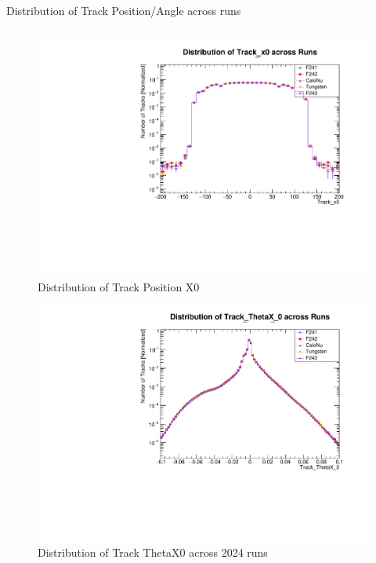 \begin{frame}{Distribution of Track Position/Angle across runs}
	\begin{columns}
		\begin{column}{0.5\linewidth}
			\vspace{-0.4cm}
			\begin{figure}
				\includegraphics[width=\linewidth]{./RunwisePlots/Track_x0_runwise.pdf}
				\caption{Distribution of Track Position X0}
			\end{figure}
			\vspace{-0.9cm}
			\begin{figure}
				\includegraphics[width=\linewidth]{./RunwisePlots/Track_ThetaX_0_runwise.pdf}
				\caption{Distribution of Track ThetaX0 across 2024 runs}
			\end{figure}

\end{column}
\end{columns}
\end{frame}
